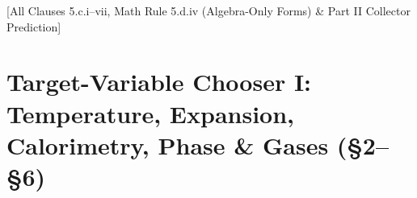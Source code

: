 \vspace{-6pt}
[All Clauses 5.c.i--vii, Math Rule 5.d.iv (Algebra-Only Forms) \& Part II Collector Prediction]
\vspace{-4pt}

\section{Target-Variable Chooser I: Temperature, Expansion, Calorimetry, Phase \& Gases (\S2--\S6)}\label{app:B.1}
